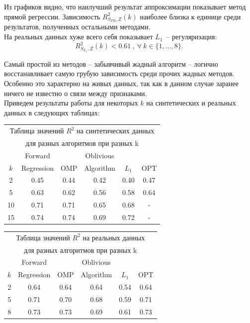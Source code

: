 \documentclass[preprint,12pt]{elsarticle}
\begin{document}
Из графиков видно, что наилучший результат аппроксимации показывает метод прямой регрессии. Зависимость $R^2_{S_{FR}, Z}(k)$ наиболее близка к единице среди результатов, полученных остальными методами.\\

На реальных данных хуже всего себя показывает $L_1$~-- регуляризация: \[R^2_{S_{L_1}, Z}(k)<0.61~,~\forall~k\in\{1,\dots,8\}.\]

Самый простой из методов -- забывчивый жадный алгоритм -- логично восстанавливает самую грубую зависимость среди прочих жадных методов. Особенно это характерно на живых данных, так как в данном случае заранее ничего не известно о связи между признаками. \\

Приведем результаты работы для некоторых $k$ на синтетических и реальных данных в следующих таблицах: 

\begin{table}[H]
    \centering
     \begin{tabular}{ |c|c|c|c|c|c| } 
        \hline
        \multicolumn{6}{|c|}{Таблица значений $R^2$ на синтетических данных}\\
        \multicolumn{6}{|c|}{для разных алгоритмов при разных k}\\
        \hline
          & Forward  &  & Oblivious& & \\ 
          $k$&  Regression & OMP & Algorithm & $L_1$ & OPT\\
         \hline
         2 & 0.45 & 0.44 & 0.42 & 0.40 & 0.47\\ 
         \hline
         5 & 0.63 & 0.62 & 0.56 & 0.58 & 0.64\\ 
         \hline
         10 & 0.71 & 0.71 & 0.65& 0.68 & - \\ 
         \hline
         15 & 0.74 & 0.74 & 0.69& 0.72 & -\\ 
         \hline
    \end{tabular}
\end{table}


\begin{table}[H]
    \centering
    \begin{tabular}{ |c|c|c|c|c|c| } 
        \hline
        \multicolumn{6}{|c|}{Таблица значений $R^2$ на реальных данных}\\
        \multicolumn{6}{|c|}{для разных алгоритмов при разных k}\\
        \hline
          & Forward  &  & Oblivious& & \\ 
          $k$&  Regression & OMP & Algorithm & $L_1$ & OPT\\
         \hline
         2 & 0.64 & 0.64 & 0.64 & 0.54 & 0.64\\ 
         \hline
         5 & 0.71 & 0.70 & 0.68 & 0.59 & 0.71\\ 
         \hline
         8 & 0.73 & 0.73 & 0.69& 0.61 & 0.73\\ 
         \hline
    \end{tabular}
\end{table}
\end{document}
